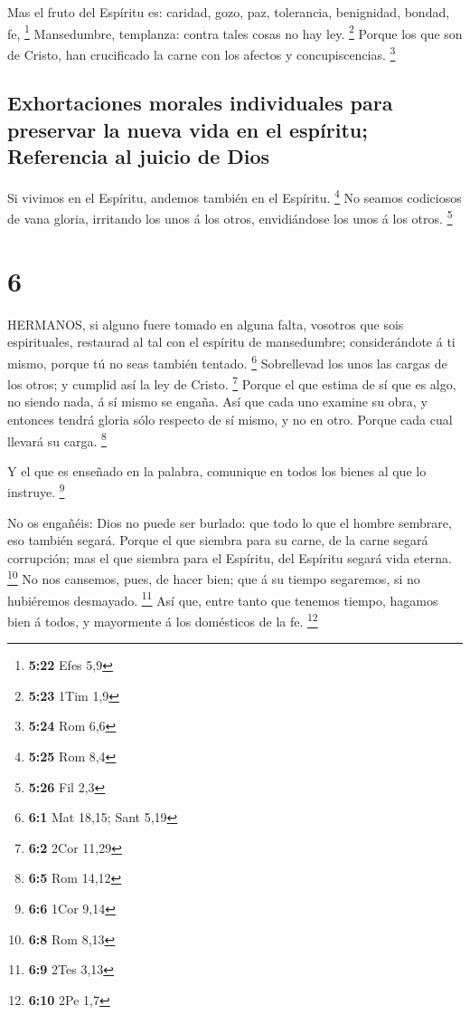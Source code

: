  Mas el fruto del Espíritu es: caridad, gozo, paz,
tolerancia, benignidad, bondad, fe, \footnote{\textbf{5:22} Efes 5,9}
 Mansedumbre, templanza: contra tales cosas no hay ley.
\footnote{\textbf{5:23} 1Tim 1,9}  Porque los que son de
Cristo, han crucificado la carne con los afectos y concupiscencias.
\footnote{\textbf{5:24} Rom 6,6}

\hypertarget{exhortaciones-morales-individuales-para-preservar-la-nueva-vida-en-el-espuxedritu-referencia-al-juicio-de-dios}{%
\subsection{Exhortaciones morales individuales para preservar la nueva
vida en el espíritu; Referencia al juicio de
Dios}\label{exhortaciones-morales-individuales-para-preservar-la-nueva-vida-en-el-espuxedritu-referencia-al-juicio-de-dios}}

 Si vivimos en el Espíritu, andemos también en el Espíritu.
\footnote{\textbf{5:25} Rom 8,4}  No seamos codiciosos de
vana gloria, irritando los unos á los otros, envidiándose los unos á los
otros. \footnote{\textbf{5:26} Fil 2,3}

\hypertarget{section-5}{%
\section{6}\label{section-5}}

 HERMANOS, si alguno fuere tomado en alguna falta, vosotros
que sois espirituales, restaurad al tal con el espíritu de mansedumbre;
considerándote á ti mismo, porque tú no seas también tentado.
\footnote{\textbf{6:1} Mat 18,15; Sant 5,19}  Sobrellevad
los unos las cargas de los otros; y cumplid así la ley de Cristo.
\footnote{\textbf{6:2} 2Cor 11,29}  Porque el que estima de
sí que es algo, no siendo nada, á sí mismo se engaña.  Así
que cada uno examine su obra, y entonces tendrá gloria sólo respecto de
sí mismo, y no en otro.  Porque cada cual llevará su carga.
\footnote{\textbf{6:5} Rom 14,12}

 Y el que es enseñado en la palabra, comunique en todos los
bienes al que lo instruye. \footnote{\textbf{6:6} 1Cor 9,14}

 No os engañéis: Dios no puede ser burlado: que todo lo que
el hombre sembrare, eso también segará.  Porque el que
siembra para su carne, de la carne segará corrupción; mas el que siembra
para el Espíritu, del Espíritu segará vida eterna. \footnote{\textbf{6:8}
  Rom 8,13}  No nos cansemos, pues, de hacer bien; que á su
tiempo segaremos, si no hubiéremos desmayado. \footnote{\textbf{6:9}
  2Tes 3,13}  Así que, entre tanto que tenemos tiempo,
hagamos bien á todos, y mayormente á los domésticos de la fe.
\footnote{\textbf{6:10} 2Pe 1,7}

